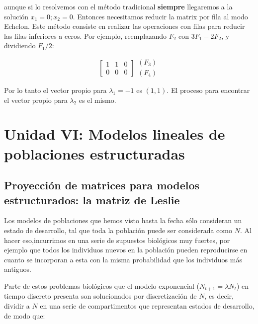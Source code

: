 \documentclass[
]{book}
\begin{document}
aunque si lo resolvemos con el método tradicional \textbf{siempre} llegaremos a la solución \(x_1 = 0; x_2 = 0\). Entonces necesitamos reducir la matrix por fila al modo Echelon. Este método consiste en realizar las operaciones con filas para reducir las filas inferiores a ceros. Por ejemplo, reemplazando \(F_2\) con \(3 F_1 - 2F_2\), y dividiendo \(F_1/2\):

\begin{equation}
\left[ \begin{array}{cc|c}
1 & 1 & 0 \\
0 & 0 & 0
\end{array}\right] 
\begin{array}{c}
(F_3) \\ (F_4)
\end{array}
\end{equation}

Por lo tanto el vector propio para \(\lambda_1 = -1\) es \((1, 1)\). El proceso para encontrar el vector propio para \(\lambda_2\) es el mismo.

\hypertarget{unidad-vi-modelos-lineales-de-poblaciones-estructuradas}{%
\chapter{Unidad VI: Modelos lineales de poblaciones estructuradas}\label{unidad-vi-modelos-lineales-de-poblaciones-estructuradas}}

\hypertarget{proyecciuxf3n-de-matrices-para-modelos-estructurados-la-matriz-de-leslie}{%
\section{Proyección de matrices para modelos estructurados: la matriz de Leslie}\label{proyecciuxf3n-de-matrices-para-modelos-estructurados-la-matriz-de-leslie}}

Los modelos de poblaciones que hemos visto hasta la fecha sólo consideran un estado de desarrollo, tal que toda la población puede ser considerada como \(N\). Al hacer eso,incurrimos en una serie de supuestos biológicos muy fuertes, por ejemplo que todos los individuos nuevos en la población pueden reproducirse en cuanto se incorporan a esta con la misma probabilidad que los individuos más antiguos.

Parte de estos problemas biológicos que el modelo exponencial (\(N_{t+1} = \lambda N_t\)) en tiempo discreto presenta son solucionados por discretización de \(N\), es decir, dividir a \(N\) en una serie de compartimentos que representan estados de desarrollo, de modo que:
\end{document}
